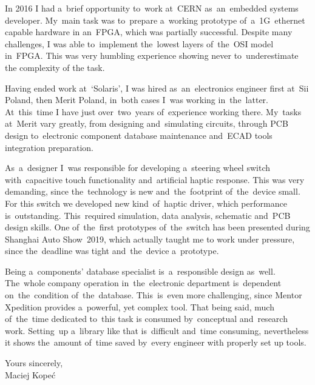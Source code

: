 \documentclass[11pt,a4paper,sans]{article}
\begin{document}
	In 2016 I had a~brief opportunity to~work at~CERN as~an~embedded systems developer. My~main
	task was to~prepare a~working prototype of~a~1G~ethernet capable hardware in an~FPGA,
	which was partially successful. Despite many challenges, I was able to~implement the~lowest
	layers of~the~OSI model in~FPGA. This was very humbling experience showing never to~underestimate
	the complexity of the task.
	
	Having ended work at~`Solaris', I was hired as~an~electronics engineer first at~Sii Poland,
	then Merit Poland, in~both cases I~was working in~the~latter. At~this~time I have just 
	over~two~years of~experience working there. My~tasks at~Merit vary greatly, from designing
	and~simulating circuits, through PCB design to~electronic component database maintenance
	and~ECAD tools integration preparation.
	
	As~a~designer I~was responsible for developing a~steering wheel switch with~capacitive touch
	functionality and~artificial haptic response. This was very demanding, since the~technology
	is new and~the~footprint of~the~device small. For this switch we developed new kind~of~haptic
	driver, which performance is~outstanding. This~required simulation, data analysis, schematic 
	and~PCB design skills. One of~the~first prototypes of~the~switch has been presented	during
	Shanghai Auto Show~2019, which actually taught me to work under pressure, since the~deadline
	was tight and~the~device a~prototype.
	
	Being a~components' database specialist is~a~responsible design as~well. The~whole company
	operation in~the~electronic department is~dependent on~the~condition of~the~database. 
	This~is~even more challenging, since Mentor Xpedition provides a~powerful, yet complex
	tool. That being said, much of~the~time dedicated to~this task is consumed by~conceptual
	and~research work. Setting~up a~library like that is~difficult and~time consuming, nevertheless
	it shows the~amount of~time saved by~every engineer with properly set up tools.

	\vspace{3\baselineskip}
	\hfill
	\begin{minipage}{0.3\linewidth}
		\begin{flushleft}
			Yours sincerely,
			\\\vspace{3\baselineskip}
			Maciej Kopeć
		\end{flushleft}
	\end{minipage}
	
\end{document}
